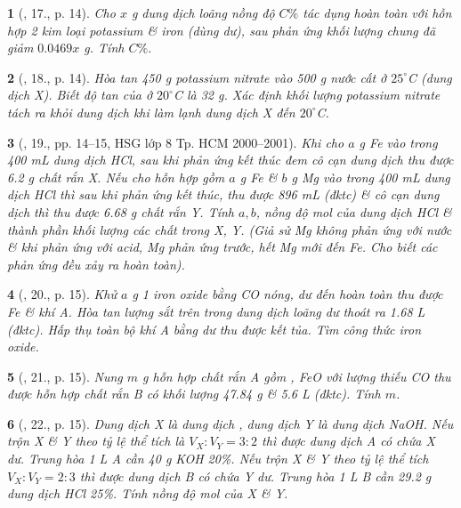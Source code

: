 \documentclass{article}
\newtheorem{baitoan}{}
\begin{document}
\begin{baitoan}[\cite{An_400_BT_Hoa_Hoc_9}, 17., p. 14]
	Cho $x$ {\rm g} dung dịch {\rm{}} loãng nồng độ $C\%$ tác dụng hoàn toàn với hỗn hợp 2 kim loại potassium \& iron (dùng dư), sau phản ứng khối lượng chung đã giảm $0.0469x$ {\rm g}. Tính $C\%$.
\end{baitoan}

\begin{baitoan}[\cite{An_400_BT_Hoa_Hoc_9}, 18., p. 14]
	Hòa tan {\rm450 g} potassium nitrate vào {\rm500 g} nước cất ở $25^\circ${\rm C} (dung dịch X). Biết độ tan của {\rm{}} ở $20^\circ${\rm C} là {\rm32 g}. Xác định khối lượng potassium nitrate tách ra khỏi dung dịch khi làm lạnh dung dịch X đến $20^\circ${\rm C}.
\end{baitoan}

\begin{baitoan}[\cite{An_400_BT_Hoa_Hoc_9}, 19., pp. 14--15, HSG lớp 8 Tp. HCM 2000--2001]
	Khi cho $a$ {\rm g Fe} vào trong {\rm400 mL} dung dịch {\rm HCl}, sau khi phản ứng kết thúc đem cô cạn dung dịch thu được {\rm6.2 g} chất rắn X. Nếu cho hỗn hợp gồm $a$ {\rm g Fe} \& $b$ {\rm g Mg} vào trong {\rm400 mL} dung dịch {\rm HCl} thì sau khi phản ứng kết thúc, thu được {\rm896 mL } (đktc) \& cô cạn dung dịch thì thu được {\rm6.68 g} chất rắn Y. Tính $a,b$, nồng độ mol của dung dịch {\rm HCl} \& thành phần khối lượng các chất trong X, Y. (Giả sử {\rm Mg} không phản ứng với nước \& khi phản ứng với acid, {\rm Mg} phản ứng trước, hết {\rm Mg} mới đến {\rm Fe}. Cho biết các phản ứng đều xảy ra hoàn toàn).
\end{baitoan}

\begin{baitoan}[\cite{An_400_BT_Hoa_Hoc_9}, 20., p. 15]
	Khử $a$ {\rm g} 1 iron oxide bằng {\rm CO} nóng, dư đến hoàn toàn thu được {\rm Fe} \& khí A. Hòa tan lượng sắt trên trong dung dịch {\rm{}} loãng dư thoát ra {\rm1.68 L } (đktc). Hấp thụ toàn bộ khí A bằng {\rm{}} dư thu được kết tủa. Tìm công thức iron oxide.
\end{baitoan}

\begin{baitoan}[\cite{An_400_BT_Hoa_Hoc_9}, 21., p. 15]
	Nung $m$ {\rm g} hỗn hợp chất rắn A gồm {\rm{}, FeO} với lượng thiếu {\rm CO} thu được hỗn hợp chất rắn B có khối lượng {\rm47.84 g} \& {\rm5.6 L } (đktc). Tính $m$.
\end{baitoan}

\begin{baitoan}[\cite{An_400_BT_Hoa_Hoc_9}, 22., p. 15]
	Dung dịch X là dung dịch {\rm{}}, dung dịch Y là dung dịch {\rm NaOH}. Nếu trộn X \& Y theo tỷ lệ thể tích là $V_X:V_Y = 3:2$ thì được dung dịch A có chứa X dư. Trung hòa {\rm1 L} A cần {\rm40 g KOH 20\%}. Nếu trộn X \& Y theo tỷ lệ thể tích $V_X:V_Y = 2:3$ thì được dung dịch B có chứa Y dư. Trung hòa {\rm1 L} B cần {\rm29.2 g} dung dịch {\rm HCl 25\%}. Tính nồng độ mol của X \& Y.
\end{baitoan}
\end{document}
